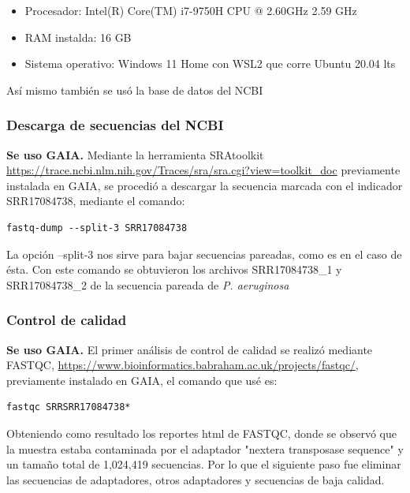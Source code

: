 \documentclass[journal, letterpaper, 11pt]{IEEEtran}
\begin{document}
\begin{itemize}
\item Procesador: Intel(R) Core(TM) i7-9750H CPU @ 2.60GHz   2.59 GHz
\item RAM instalda: 16 GB
\item Sistema operativo: Windows 11 Home con WSL2 que corre Ubuntu 20.04 lts
\end{itemize}

Así mismo también se usó la base de datos del NCBI \linebreak

\subsubsection{Descarga de secuencias del NCBI}
\textbf{Se uso GAIA.} Mediante la herramienta SRAtoolkit \url{https://trace.ncbi.nlm.nih.gov/Traces/sra/sra.cgi?view=toolkit_doc} previamente instalada en GAIA, se procedió a descargar la secuencia marcada con el indicador SRR17084738, mediante el comando:

\lstset{breaklines=true, basicstyle=\footnotesize}
\begin{lstlisting}[frame=single]
fastq-dump --split-3 SRR17084738
\end{lstlisting}

La opción --split-3 nos sirve para bajar secuencias pareadas, como es en el caso de ésta. Con este comando se obtuvieron los archivos SRR17084738\_1 y SRR17084738\_2 de la secuencia pareada de \textit{P. aeruginosa}
\linebreak
\subsubsection{Control de calidad}
\textbf{Se uso GAIA.} El primer análisis de control de calidad se realizó mediante FASTQC, \url{https://www.bioinformatics.babraham.ac.uk/projects/fastqc/}, previamente instalado en GAIA, el comando que usé es:

\lstset{breaklines=true, basicstyle=\footnotesize}
\begin{lstlisting}[frame=single]
fastqc SRRSRR17084738*
\end{lstlisting}

Obteniendo como resultado los reportes html de FASTQC, donde se observó que la muestra estaba contaminada por el adaptador "nextera transposase sequence" y un tamaño total de 1,024,419 secuencias. Por lo que el siguiente paso fue eliminar las secuencias de adaptadores, otros adaptadores y secuencias de baja calidad.
\linebreak
\end{document}
